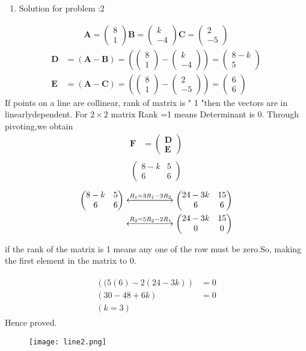 \documentclass[12pt]{article}
\newcommand{\myvec}[1]{\ensuremath{\begin{pmatrix}#1\end{pmatrix}}}
\let\vec\mathbf
\providecommand{\brak}[1]{\ensuremath{\left(#1\right)}}
\let\vec\mathbf
\begin{document}
\begin{enumerate} 
\item Solution for problem :2
\end{enumerate} 
\begin{align}  
\vec{A}=\myvec{8 \\ 1}
\vec{B}=\myvec{k \\ -4}
\vec{C}=\myvec{2 \\ -5}
\end{align}
\begin{align}  
 \vec{D} &=\brak{\vec{A}-\vec{B}} = \brak{\myvec{8 \\1 } - \myvec{k \\-4 } } = \myvec{8-k \\ 5 }\\
\vec{E} &= \brak{\vec{A}-\vec{C}} = \brak{\myvec{8 \\ 1 } - \myvec{2 \\-5 } } = \myvec{6 \\6}
\end{align}
If points on a line  are  collinear, rank of matrix is " 1 "then the vectors are in linearlydependent.
For $2\times2$ matrix Rank =1 means Determinant is 0.
Through pivoting,we obtain
\begin{align}
\vec{F} &={\myvec{\vec{D}\\ \vec{E}}}
\end{align}
\begin{align}
\begin{split}
\myvec{
8-k & 5
 \\
6 & 6
}
\end{split}
\end{align}
\begin{align}
\label{eq:chem_balance_mat_row}
\myvec{
8-k & 5
\\
6 & 6
}
 \xleftrightarrow[]{R_1 = 3R_1-3R_2}
\myvec{
24-3k & 15
\\
6 & 6
}
\\
\xleftrightarrow[]{R_2 = 5R_2-2R_1}
\myvec{
24-3k & 15
\\
0 & 0
}
\end{align}

if the rank of the matrix is 1 means any one of the row must be zero.So, making the first element in the matrix to 0.

\begin{align}
\begin{split}
\brak{(5(6)-2(24-3k)}&=0
\\
\brak{30-48+6k}&=0
\\
\brak{k=3} 
\end{split}
\end{align}
Hence proved.

\begin{figure}[h!]
	  \centering 
	  \texttt{[image: line2.png]}
	  \caption{}
	  \label{fig:line2.png}
	  \end{figure} 
\end{document}
